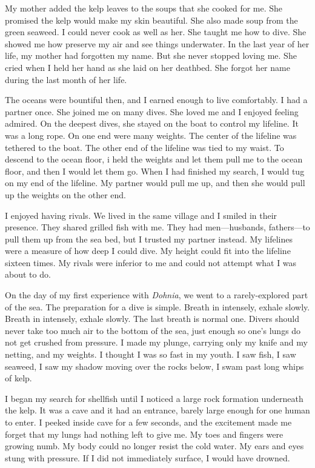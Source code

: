 \documentclass[12pt, letterpaper]{report}
\begin{document}
\vspace{1\baselineskip}
My mother added the kelp leaves to the soups that she cooked for me. She promised the kelp would make my skin beautiful. She also made soup from the green seaweed. I could never cook as well as her. She taught me how to dive. She showed me how preserve my air and see things underwater. In the last year of her life, my mother had forgotten my name. But she never stopped loving me. She cried when I held her hand as she laid on her deathbed. She forgot her name during the last month of her life.

\vspace{1\baselineskip}
The oceans were bountiful then, and I earned enough to live comfortably. I had a partner once. She joined me on many dives. She loved me and I enjoyed feeling admired. On the deepest dives, she stayed on the boat to control my lifeline. It was a long rope. On one end were many weights. The center of the lifeline was tethered to the boat. The other end of the lifeline was tied to my waist. To descend to the ocean floor, i held the weights and let them pull me to the ocean floor, and then I would let them go. When I had finished my search, I would tug on my end of the lifeline. My partner would pull me up, and then she would pull up the weights on the other end. 

\vspace{1\baselineskip}
I enjoyed having rivals. We lived in the same village and I smiled in their presence. They shared grilled fish with me. They had men---husbands, fathers---to pull them up from the sea bed, but I trusted my partner instead. My lifelines were a measure of how deep I could dive. My height could fit into the lifeline sixteen times. My rivals were inferior to me and could not attempt what I was about to do. 

\vspace{1\baselineskip}
On the day of my first experience with \textit{Dohnia}, we went to a rarely-explored part of the sea. The preparation for a dive is simple. Breath in intensely, exhale slowly. Breath in intensely, exhale slowly. The last breath is normal one. Divers should never take too much air to the bottom of the sea, just enough so one's lungs do not get crushed from pressure. I made my plunge, carrying only my knife and my netting, and my weights. I thought I was so fast in my youth. I saw fish, I saw seaweed, I saw my shadow moving over the rocks below, I swam past long whips of kelp.

\vspace{1\baselineskip}
I began my search for shellfish until I noticed a large rock formation underneath the kelp. It was a cave and it had an entrance, barely large enough for one human to enter. I peeked inside cave for a few seconds, and the excitement made me forget that my lungs had nothing left to give me. My toes and fingers were growing numb. My body could no longer resist the cold water. My ears and eyes stung with pressure. If I did not immediately surface, I would have drowned. 
\end{document}
